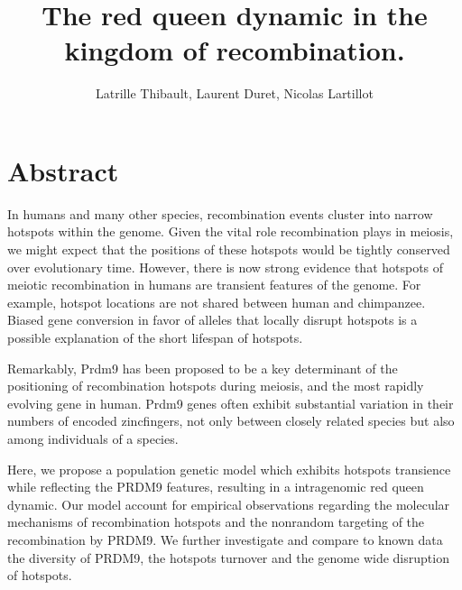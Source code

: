 \documentclass{article}
\author{Latrille Thibault, Laurent Duret, Nicolas Lartillot}
\title{The red queen dynamic in the kingdom of recombination.}
\begin{document}
\maketitle 

\newcommand{\Ne}{N_\mathrm{e}}


\section{Abstract}

In humans and many other species, recombination events cluster into narrow hotspots within the genome. Given the vital role recombination plays in meiosis, we might expect that the positions of these hotspots would be tightly conserved over evolutionary time. However, there is now strong evidence that hotspots of meiotic recombination in humans are transient features of the genome. For example, hotspot locations are not shared between human and chimpanzee. Biased gene conversion in favor of alleles that locally disrupt hotspots is a possible explanation of the short lifespan of hotspots.

Remarkably, Prdm9 has been proposed to be a key determinant of the positioning of recombination hotspots during meiosis, and the most rapidly evolving gene in human. Prdm9 genes often exhibit substantial variation in their numbers of encoded zincfingers, not only between closely related species but also among individuals of a species.

Here, we propose a population genetic model which exhibits hotspots transience while reflecting the PRDM9 features, resulting in a intragenomic red queen dynamic. Our model account for empirical observations regarding the molecular mechanisms of recombination hotspots and the nonrandom targeting of the recombination by PRDM9. We further investigate and compare to known data the diversity of PRDM9, the hotspots turnover and the genome wide disruption of hotspots.


\end{document}
